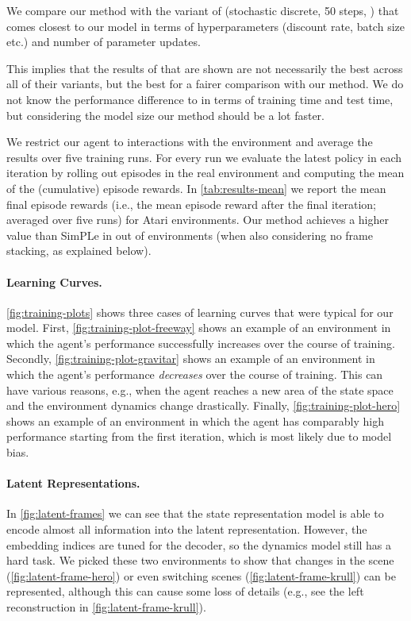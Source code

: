 \documentclass{article}
\begin{document}
We compare our method with the variant of \citet{simple} (stochastic discrete,
50 steps, ) that comes closest to our model in terms of
hyperparameters (discount rate, batch size etc.) and number of parameter
updates.

This implies that the results of \citet{simple} that are shown are not
necessarily the best across all of their variants, but the best for a fairer
comparison with our method. We do not know the performance difference to
\citet{simple} in terms of training time and test time, but considering the
model size our method should be a lot faster.

We restrict our agent to  interactions with the environment and average
the results over five training runs. For every run we evaluate the latest policy
in each iteration by rolling out  episodes in the real environment and
computing the mean of the (cumulative) episode rewards. In
\cref{tab:results-mean} we report the mean final episode rewards (i.e., the mean
episode reward after the final iteration; averaged over five runs) for 
Atari environments. Our method achieves a higher value than SimPLe \cite{simple}
in  out of  environments (when also considering no frame stacking, as
explained below).

\paragraph{Learning Curves.}
\cref{fig:training-plots} shows three cases of learning curves that were typical
for our model. First, \cref{fig:training-plot-freeway} shows an example of an
environment in which the agent's performance successfully increases over the
course of training. Secondly, \cref{fig:training-plot-gravitar} shows an
example of an environment in which the agent's performance \textit{decreases}
over the course of training. This can have various reasons, e.g., when the
agent reaches a new area of the state space and the environment dynamics change
drastically. Finally, \cref{fig:training-plot-hero} shows an example of an
environment in which the agent has comparably high performance starting from
the first iteration, which is most likely due to model bias.

\paragraph{Latent Representations.}
In \cref{fig:latent-frames} we can see that the state representation model is
able to encode almost all information into the latent representation. However,
the embedding indices are tuned for the decoder, so the dynamics model still has
a hard task. We picked these two environments to show that changes in the scene
(\cref{fig:latent-frame-hero}) or even switching scenes
(\cref{fig:latent-frame-krull}) can be represented, although this can cause some
loss of details (e.g., see the left reconstruction in
\cref{fig:latent-frame-krull}).
\end{document}

